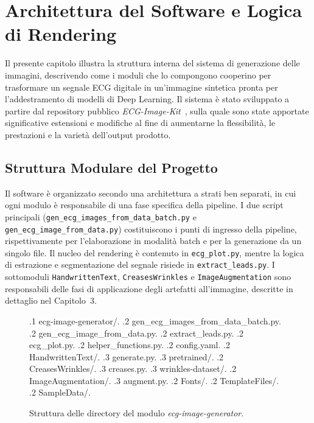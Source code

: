 \chapter{Architettura del Software e Logica di Rendering}

Il presente capitolo illustra la struttura interna del sistema di generazione delle immagini, descrivendo come i moduli che lo compongono cooperino per trasformare un segnale ECG digitale in un'immagine sintetica pronta per l'addestramento di modelli di Deep Learning. Il sistema è stato sviluppato a partire dal repository pubblico \textit{ECG-Image-Kit}~\cite{ecgimagekitpaper}, sulla quale sono state apportate significative estensioni e modifiche al fine di aumentarne la flessibilità, le prestazioni e la varietà dell'output prodotto.

\section{Struttura Modulare del Progetto}

Il software è organizzato secondo una architettura a strati ben separati, in cui ogni modulo è responsabile di una fase specifica della pipeline. I due script principali (\texttt{gen\_ecg\_images\allowbreak{}\_from\_\allowbreak{}data\_batch.py} e \texttt{gen\_ecg\_image\allowbreak{}\_from\_\allowbreak{}data.py}) costituiscono i punti di ingresso della pipeline, rispettivamente per l'elaborazione in modalità batch e per la generazione da un singolo file. Il nucleo del rendering è contenuto in \texttt{ecg\_plot.py}, mentre la logica di estrazione e segmentazione del segnale risiede in \texttt{extract\_leads.py}. I sottomoduli \texttt{HandwrittenText}, \texttt{CreasesWrinkles} e \texttt{ImageAugmentation} sono responsabili delle fasi di applicazione degli artefatti all'immagine, descritte in dettaglio nel Capitolo~3.

\begin{figure}[H]
\centering
\begin{dirtree}{%
.1 ecg-image-generator/.
.2 gen\_ecg\_images\_from\_data\_batch.py.
.2 gen\_ecg\_image\_from\_data.py.
.2 extract\_leads.py.
.2 ecg\_plot.py.
.2 helper\_functions.py.
.2 config.yaml.
.2 HandwrittenText/.
.3 generate.py.
.3 pretrained/.
.2 CreasesWrinkles/.
.3 creases.py.
.3 wrinkles-dataset/.
.2 ImageAugmentation/.
.3 augment.py.
.2 Fonts/.
.2 TemplateFiles/.
.2 SampleData/.
}
\caption{Struttura delle directory del modulo \textit{ecg-image-generator}.}
\label{fig:dirtree}
\end{dirtree}
\end{figure}

